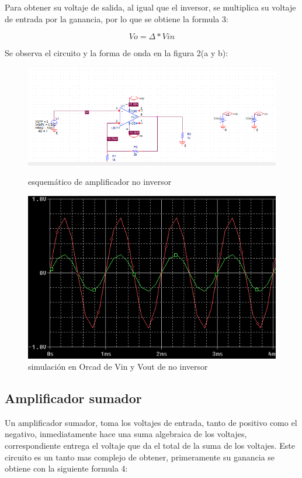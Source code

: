 \documentclass[11pt,a4paper]{article}
\begin{document}
Para obtener su voltaje de salida, al igual que el inversor, se multiplica su voltaje de entrada por la ganancia, por lo que se obtiene la formula 3:

\begin{equation}
Vo=\Delta*Vin
\end{equation}

Se observa el circuito y la forma de onda en la figura 2(a y b):

\begin{figure}[ht]
\begin{center}
\includegraphics[scale=0.5]{3.PNG}
\caption{esquemático de amplificador no inversor}
\includegraphics[scale=0.5]{4.PNG}
\caption{simulación en Orcad de Vin y Vout de no inversor}
\end{center}
\end{figure}

\subsection{Amplificador sumador}

Un amplificador sumador, toma los voltajes de entrada, tanto de positivo como el negativo, inmediatamente hace una suma algebraica de los voltajes, correspondiente entrega el voltaje que da el total de la suma de los voltajes. Este circuito es un tanto mas complejo de obtener, primeramente su ganancia se obtiene con la siguiente formula 4:
\end{document}
